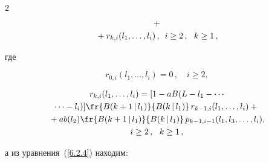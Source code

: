 \begin{multicols}{2}
\begin{multline}
+{}


\\


{}+r_{k,i}(l_1,\ldots,l_i)\,,


\enskip


i \ge 2\,,\ \ k\ge 1\,,


\label{6.2.7}


\end{multline}




где


\begin{equation}


\label{6.2.8}


r_{0,i}(l_1,\ldots,l_i)


= 0\,,\quad


i \ge 2,


\end{equation}





\vspace*{-9pt}





\noindent


\begin{multline}


r_{k,i}(l_1,\ldots,l_i)


=[1 - a B(L-l_1-\cdots\\


\cdots -l_i)]


\fr{B(k+1\,|\,l_1)}{ B(k\,|\,l_1)}


\,r_{k-1,i}(l_1,\ldots,l_i)


 +{}


\\


{}+


a b(l_2)


\fr{B(k+1\,|\,l_1)}{ B(k\,|\,l_1)}


\,p_{k-1,i-1}(l_1,l_3,\ldots,l_i),


\\


 i \ge 2\,,\ \ k\ge 1\,,


\label{6.2.9}


\end{multline}


а из уравнения~(\ref{6.2.4}) находим:





\end{multicols}
